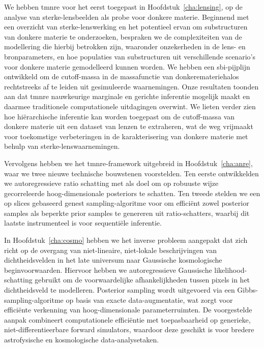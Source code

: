 We hebben \gls*{tmnre} voor het eerst toegepast in Hoofdstuk~\ref{cha:lensing}, op de analyse van sterke-lensbeelden als probe voor donkere materie. Beginnend met een overzicht van sterke-lenswerking en het potentieel ervan om substructuren van donkere materie te onderzoeken, bespraken we de complexiteiten van de modellering die hierbij betrokken zijn, waaronder onzekerheden in de lens- en bronparameters, en hoe populaties van substructuren uit verschillende scenario’s voor donkere materie gemodelleerd kunnen worden. We hebben een \gls*{sbi}-pijplijn ontwikkeld om de cutoff-massa in de massafunctie van donkeremateriehalos rechtstreeks af te leiden uit gesimuleerde waarnemingen. Onze resultaten toonden aan dat \gls*{tmnre} nauwkeurige marginale en gerichte inferentie mogelijk maakt en daarmee traditionele computationele uitdagingen overwint. We lieten verder zien hoe hiërarchische inferentie kan worden toegepast om de cutoff-massa van donkere materie uit een dataset van lenzen te extraheren, wat de weg vrijmaakt voor toekomstige verbeteringen in de karakterisering van donkere materie met behulp van sterke-lenswaarnemingen. 

Vervolgens hebben we het \gls*{tmnre}-framework uitgebreid in Hoofdstuk~\ref{cha:anre}, waar we twee nieuwe technische bouwstenen voorstelden. Ten eerste ontwikkelden we autoregressieve ratio schatting met als doel om op robuuste wijze gecorreleerde hoog-dimensionale posteriors te schatten. Ten tweede stelden we een op slices gebaseerd genest sampling-algoritme voor om efficiënt zowel posterior samples als beperkte prior samples te genereren uit ratio-schatters, waarbij dit laatste instrumenteel is voor sequentiële inferentie. 

In Hoofdstuk~\ref{cha:cosmo} hebben we het inverse probleem aangepakt dat zich richt op de overgang van niet-lineaire, niet-lokale beschrijvingen van dichtheidsvelden in het late universum naar Gaussische kosmologische beginvoorwaarden. Hiervoor hebben we autoregressieve Gaussische likelihood-schatting gebruikt om de voorwaardelijke afhankelijkheden tussen pixels in het dichtheidsveld te modelleren. Posterior sampling wordt uitgevoerd via een Gibbs-sampling-algoritme op basis van exacte data-augmentatie, wat zorgt voor efficiënte verkenning van hoog-dimensionale parameterruimten. De voorgestelde aanpak combineert computationele efficiëntie met toepasbaarheid op generieke, niet-differentieerbare forward simulators, waardoor deze geschikt is voor bredere astrofysische en kosmologische data-analysetaken. 

